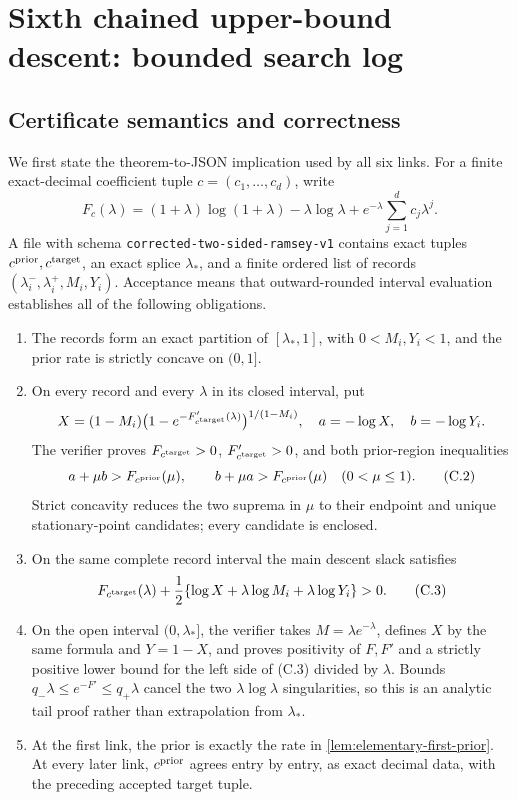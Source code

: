 \section{Sixth chained upper-bound descent: bounded search log}

\subsection{Certificate semantics and correctness}

We first state the theorem-to-JSON implication used by all six links.  For a
finite exact-decimal coefficient tuple \(c=(c_1,\ldots,c_d)\), write
\[
 F_c(\lambda)=(1+\lambda)\log(1+\lambda)-\lambda\log\lambda
 +e^{-\lambda}\sum_{j=1}^d c_j\lambda^j.
 \tag{C.1}
\]
A file with schema \texttt{corrected-two-sided-ramsey-v1} contains exact
tuples \(c^{\rm prior},c^{\rm target}\), an exact splice
\(\lambda_*\), and a finite ordered list of records
\((\lambda_i^-,\lambda_i^+,M_i,Y_i)\).  Acceptance means that outward-rounded
interval evaluation establishes all of the following obligations.

\begin{enumerate}[label=(\roman*)]
\item The records form an exact partition of \([\lambda_*,1]\), with
      \(0<M_i,Y_i<1\), and the prior rate is strictly concave on
      \((0,1]\).
\item On every record and every \(\lambda\) in its closed interval, put
      \[
       X=(1-M_i)
       \bigl(1-e^{-F'_{c^{\rm target}}(\lambda)}\bigr)^{1/(1-M_i)},
       \quad a=-\log X,\quad b=-\log Y_i.
      \]
      The verifier proves \(F_{c^{\rm target}}>0\),
      \(F'_{c^{\rm target}}>0\), and both prior-region inequalities
      \[
       a+\mu b>F_{c^{\rm prior}}(\mu),\qquad
       b+\mu a>F_{c^{\rm prior}}(\mu)
       \quad(0<\mu\le1).                       \tag{C.2}
      \]
      Strict concavity reduces the two suprema in \(\mu\) to their endpoint
      and unique stationary-point candidates; every candidate is enclosed.
\item On the same complete record interval the main descent slack satisfies
      \[
       F_{c^{\rm target}}(\lambda)
       +\frac12\{\log X+\lambda\log M_i+\lambda\log Y_i\}>0. \tag{C.3}
      \]
\item On the open interval \((0,\lambda_*]\), the verifier takes
      \(M=\lambda e^{-\lambda}\), defines \(X\) by the same formula and
      \(Y=1-X\), and proves positivity of \(F,F'\) and a strictly positive
      lower bound for the left side of (C.3) divided by \(\lambda\).  Bounds
      \(q_-\lambda\le e^{-F'}\le q_+\lambda\) cancel the two
      \(\lambda\log\lambda\) singularities, so this is an analytic tail
      proof rather than extrapolation from \(\lambda_*\).
\item At the first link, the prior is exactly the rate in
      \cref{lem:elementary-first-prior}.  At every later link,
      \(c^{\rm prior}\) agrees entry by entry, as exact
      decimal data, with the preceding accepted target tuple.
\end{enumerate}

